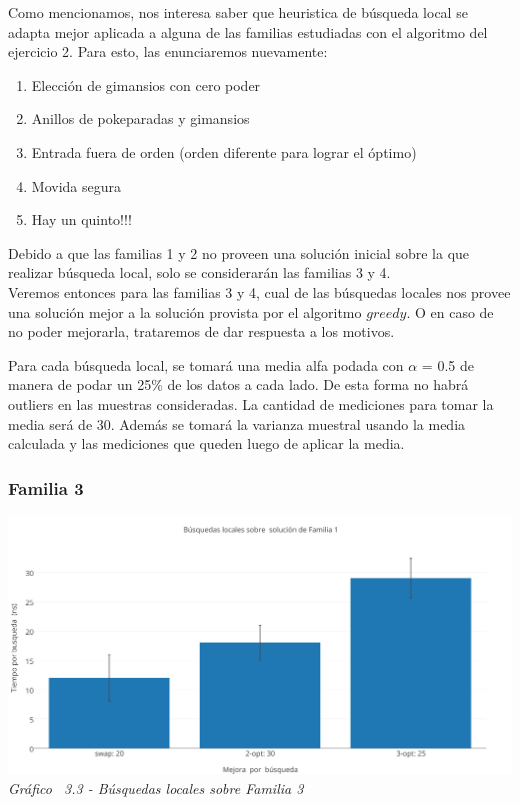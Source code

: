Como mencionamos, nos interesa saber que heuristica de búsqueda local se adapta mejor aplicada a alguna de las familias estudiadas con el algoritmo del ejercicio 2. Para esto, las enunciaremos nuevamente:

\begin{enumerate}
\item Elección de gimansios con cero poder 
\item Anillos de pokeparadas y gimansios
\item Entrada fuera de orden (orden diferente para lograr el óptimo)
\item Movida segura
\item Hay un quinto!!!
\end{enumerate}

Debido a que las familias 1 y 2 no proveen una solución inicial sobre la que realizar búsqueda local, solo se considerarán las familias 3 y 4.\\
Veremos entonces para las familias 3 y 4, cual de las búsquedas locales nos provee una solución mejor a la solución provista por el algoritmo $greedy$. O en caso de no poder mejorarla, trataremos de dar respuesta a los motivos.

Para cada búsqueda local, se tomará una media alfa podada con $\alpha$ = 0.5 de manera de podar un 25\% de los datos a cada lado. De esta forma no habrá outliers en las muestras consideradas. 
La cantidad de mediciones para tomar la media será de 30. Además se tomará la varianza muestral usando la media calculada y las mediciones que queden luego de aplicar la media.\\

\subsubsection*{Familia 3}

\vspace*{0.3cm} \vspace*{0.3cm}
  \begin{center}
 \includegraphics[scale=0.5]{./EJ3/local_search_familia.png}
 {            \textit{Gráfico \ 3.3 - Búsquedas locales sobre Familia 3}}
  \end{center}
  \vspace*{0.3cm}

